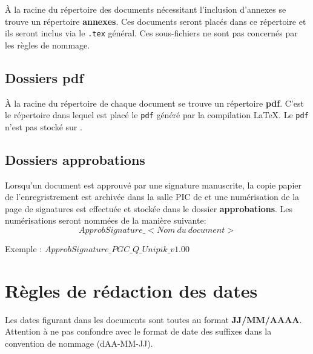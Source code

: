 \`{A} la racine du répertoire des documents nécessitant l'inclusion d'annexes se trouve un répertoire \textbf{annexes}.
Ces documents seront placés dans ce répertoire et ils seront inclus via
le \verb+.tex+ général. Ces sous-fichiers ne sont pas concernés par les règles de nommage.

\subsection{Dossiers pdf}

\`{A} la racine du répertoire de chaque document se trouve un répertoire \textbf{pdf}. C'est
le répertoire dans lequel est placé le \verb+pdf+ généré par la compilation \LaTeX{}. Le \verb+pdf+ n'est pas stocké sur \git{}.

\subsection{Dossiers approbations}

Lorsqu'un document est approuvé par une signature manuscrite, la copie papier de l'enregristrement est archivée dans la salle PIC de \nomEquipe et une numérisation de la page de signatures est effectuée et stockée dans le dossier \textbf{approbations}. Les numérisations seront nommées de la manière suivante:
\[
ApprobSignature\_<Nom\ du\ document>
\]

Exemple : $ApprobSignature\_PGC\_Q\_Unipik\_v1.00$

\section{Règles de rédaction des dates}

Les dates figurant dans les documents sont toutes au format \textbf{JJ/MM/AAAA}. Attention à ne pas confondre avec le format de date des  suffixes dans la convention de nommage (dAA-MM-JJ).

